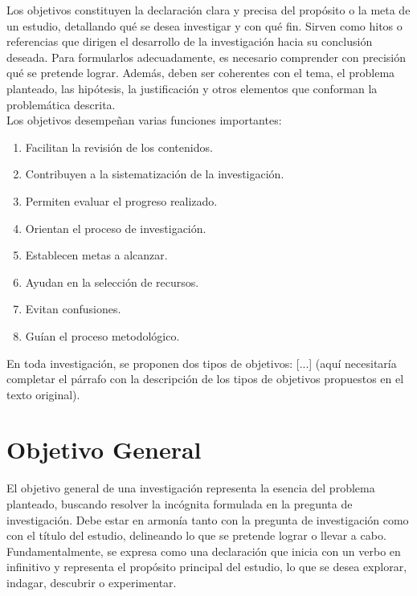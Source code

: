 \documentclass[12pt,a4paper,oneside]{report}
\begin{document}
Los objetivos constituyen la declaración clara y precisa del propósito o la meta de un estudio, detallando qué se desea investigar y con qué fin. Sirven como hitos o referencias que dirigen el desarrollo de la investigación hacia su conclusión deseada. Para formularlos adecuadamente, es necesario comprender con precisión qué se pretende lograr. Además, deben ser coherentes con el tema, el problema planteado, las hipótesis, la justificación y otros elementos que conforman la problemática descrita.\\

Los objetivos desempeñan varias funciones importantes:\\

\begin{enumerate}
    \item Facilitan la revisión de los contenidos.
    \item Contribuyen a la sistematización de la investigación.
    \item Permiten evaluar el progreso realizado.
    \item Orientan el proceso de investigación.
    \item Establecen metas a alcanzar.
    \item Ayudan en la selección de recursos.
    \item Evitan confusiones.
    \item Guían el proceso metodológico.
\end{enumerate}

En toda investigación, se proponen dos tipos de objetivos: [...] (aquí necesitaría completar el párrafo con la descripción de los tipos de objetivos propuestos en el texto original).\\

\section{Objetivo General}

El objetivo general de una investigación representa la esencia del problema planteado, buscando resolver la incógnita formulada en la pregunta de investigación. Debe estar en armonía tanto con la pregunta de investigación como con el título del estudio, delineando lo que se pretende lograr o llevar a cabo. Fundamentalmente, se expresa como una declaración que inicia con un verbo en infinitivo y representa el propósito principal del estudio, lo que se desea explorar, indagar, descubrir o experimentar.
\end{document}
